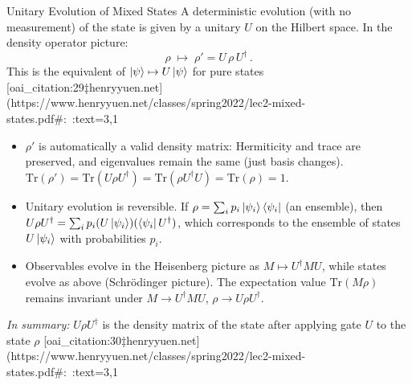 \begin{frame}{Unitary Evolution of Mixed States}
  A deterministic evolution (with no measurement) of the state is given by a unitary $U$ on the Hilbert space. In the density operator picture:
  \[
     \rho \;\mapsto\; \rho' = U\,\rho\,U^\dagger\,.
  \]
  This is the equivalent of $\ket{\psi} \mapsto U\ket{\psi}$ for pure states [oai_citation:29‡henryyuen.net](https://www.henryyuen.net/classes/spring2022/lec2-mixed-states.pdf#:~:text=3,1%
  \begin{itemize}
    \item $\rho'$ is automatically a valid density matrix: Hermiticity and trace are preserved, and eigenvalues remain the same (just basis changes). $\mathrm{Tr}(\rho') = \mathrm{Tr}(U \rho U^\dagger) = \mathrm{Tr}(\rho U^\dagger U) = \mathrm{Tr}(\rho) = 1$.
    \item Unitary evolution is reversible. If $\rho = \sum_i p_i \ket{\psi_i}\bra{\psi_i}$ (an ensemble), then $U\rho U^\dagger = \sum_i p_i (U\ket{\psi_i})(\bra{\psi_i}U^\dagger)$, which corresponds to the ensemble of states $U\ket{\psi_i}$ with probabilities $p_i$.
    \item Observables evolve in the Heisenberg picture as $M \mapsto U^\dagger M U$, while states evolve as above (Schrödinger picture). The expectation value $\mathrm{Tr}(M \rho)$ remains invariant under $M \to U^\dagger M U$, $\rho \to U\rho U^\dagger$.
  \end{itemize}
  \textit{In summary:} $U\rho U^\dagger$ is the density matrix of the state after applying gate $U$ to the state $\rho$ [oai_citation:30‡henryyuen.net](https://www.henryyuen.net/classes/spring2022/lec2-mixed-states.pdf#:~:text=3,1%
\end{frame}


